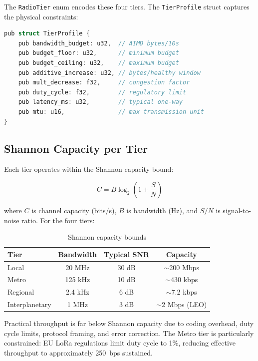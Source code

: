 \documentclass[11pt,twocolumn]{article}
\begin{document}
The \texttt{RadioTier} enum encodes these four tiers. The \texttt{TierProfile}
struct captures the physical constraints:

\begin{lstlisting}[language=C,caption={Tier profile (simplified)}]
pub struct TierProfile {
    pub bandwidth_budget: u32,  // AIMD bytes/10s
    pub budget_floor: u32,      // minimum budget
    pub budget_ceiling: u32,    // maximum budget
    pub additive_increase: u32, // bytes/healthy window
    pub mult_decrease: f32,     // congestion factor
    pub duty_cycle: f32,        // regulatory limit
    pub latency_ms: u32,        // typical one-way
    pub mtu: u16,               // max transmission unit
}
\end{lstlisting}

\subsection{Shannon Capacity per Tier}

Each tier operates within the Shannon capacity bound:

\begin{equation}
  C = B \log_2\!\left(1 + \frac{S}{N}\right)
\end{equation}

where $C$ is channel capacity (bits/s), $B$ is bandwidth (Hz), and $S/N$ is
signal-to-noise ratio. For the four tiers:

\begin{table}[H]
\centering
\caption{Shannon capacity bounds}
\label{tab:shannon}
\scriptsize
\begin{tabular}{@{}lccc@{}}
\toprule
\textbf{Tier} & \textbf{Bandwidth} & \textbf{Typical SNR} & \textbf{Capacity} \\
\midrule
Local & 20 MHz & 30 dB & $\sim$200 Mbps \\
Metro & 125 kHz & 10 dB & $\sim$430 kbps \\
Regional & 2.4 kHz & 6 dB & $\sim$7.2 kbps \\
Interplanetary & 1 MHz & 3 dB & $\sim$2 Mbps (LEO) \\
\bottomrule
\end{tabular}
\end{table}

Practical throughput is far below Shannon capacity due to coding overhead,
duty cycle limits, protocol framing, and error correction. The Metro tier
is particularly constrained: EU LoRa regulations limit duty cycle to 1\%,
reducing effective throughput to approximately 250~bps sustained.
\end{document}
